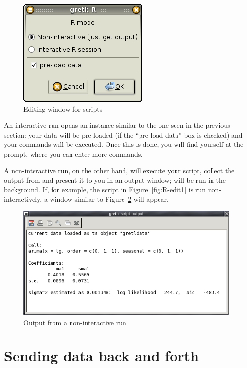 \begin{figure}[htbp]
  \centering
  \includegraphics[scale=0.7]{figures/R-exec-mode}
  \caption{Editing window for  scripts}
  \label{fig:R-exec-mode}
\end{figure}

An interactive run opens an  instance similar to the one seen
in the previous section: your data will be pre-loaded (if the
``pre-load data'' box is checked) and your commands will
be executed. Once this is done, you will find yourself at the 
prompt, where you can enter more commands.

A non-interactive run, on the other hand, will execute your script,
collect the output from  and present it to you in an output
window;  will be run in the background. If, for example, the
script in Figure~\ref{fig:R-edit1} is run non-interactively, a window
similar to Figure~\ref{fig:R-output1} will appear.

\begin{figure}[htbp]
  \centering
  \includegraphics[scale=0.7]{figures/R-output1}
  \caption{Output from a non-interactive  run}
  \label{fig:R-output1}
\end{figure}

\section{Sending data back and forth}
\label{sec:R-passing-data}

